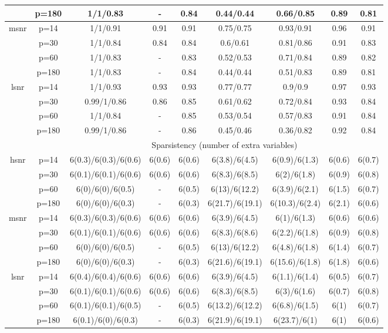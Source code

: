 \begin{table}[ht]
{\begin{tabular}{|c|c|ccccccc|}
   & p=180 & 1/1/0.83 & - & 0.84 & 0.44/0.44 & 0.66/0.85 & 0.89 & 0.81 \\ 
  \midrule\multirow{4}[2]{*}{msnr} & p=14 & 1/1/0.91 & 0.91 & 0.91 & 0.75/0.75 & 0.93/0.91 & 0.96 & 0.91 \\ 
   & p=30 & 1/1/0.84 & 0.84 & 0.84 & 0.6/0.61 & 0.81/0.86 & 0.91 & 0.83 \\ 
   & p=60 & 1/1/0.83 & - & 0.83 & 0.52/0.53 & 0.71/0.84 & 0.89 & 0.82 \\ 
   & p=180 & 1/1/0.83 & - & 0.84 & 0.44/0.44 & 0.51/0.83 & 0.89 & 0.81 \\ 
  \midrule\multirow{4}[2]{*}{lsnr} & p=14 & 1/1/0.93 & 0.93 & 0.93 & 0.77/0.77 & 0.9/0.9 & 0.97 & 0.93 \\ 
   & p=30 & 0.99/1/0.86 & 0.86 & 0.85 & 0.61/0.62 & 0.72/0.84 & 0.93 & 0.84 \\ 
   & p=60 & 1/1/0.84 & - & 0.85 & 0.53/0.54 & 0.57/0.83 & 0.91 & 0.84 \\ 
   & p=180 & 0.99/1/0.86 & - & 0.86 & 0.45/0.46 & 0.36/0.82 & 0.92 & 0.84 \\ 
   \midrule 
 \multicolumn{1}{|c}{} &       & \multicolumn{7}{c|}{Sparsistency (number of extra variables)} \\
\midrule\multirow{4}[2]{*}{hsnr} & p=14 & 6(0.3)/6(0.3)/6(0.6) & 6(0.6) & 6(0.6) & 6(3.8)/6(4.5) & 6(0.9)/6(1.3) & 6(0.6) & 6(0.7) \\ 
   & p=30 & 6(0.1)/6(0.1)/6(0.6) & 6(0.6) & 6(0.6) & 6(8.3)/6(8.5) & 6(2)/6(1.8) & 6(0.9) & 6(0.8) \\ 
   & p=60 & 6(0)/6(0)/6(0.5) & - & 6(0.5) & 6(13)/6(12.2) & 6(3.9)/6(2.1) & 6(1.5) & 6(0.7) \\ 
   & p=180 & 6(0)/6(0)/6(0.3) & - & 6(0.3) & 6(21.7)/6(19.1) & 6(10.3)/6(2.4) & 6(2.1) & 6(0.6) \\ 
  \midrule\multirow{4}[2]{*}{msnr} & p=14 & 6(0.3)/6(0.3)/6(0.6) & 6(0.6) & 6(0.6) & 6(3.9)/6(4.5) & 6(1)/6(1.3) & 6(0.6) & 6(0.6) \\ 
   & p=30 & 6(0.1)/6(0.1)/6(0.6) & 6(0.6) & 6(0.6) & 6(8.3)/6(8.6) & 6(2.2)/6(1.8) & 6(0.9) & 6(0.8) \\ 
   & p=60 & 6(0)/6(0)/6(0.5) & - & 6(0.5) & 6(13)/6(12.2) & 6(4.8)/6(1.8) & 6(1.4) & 6(0.7) \\ 
   & p=180 & 6(0)/6(0)/6(0.3) & - & 6(0.3) & 6(21.6)/6(19.1) & 6(15.6)/6(1.8) & 6(1.8) & 6(0.6) \\ 
  \midrule\multirow{4}[2]{*}{lsnr} & p=14 & 6(0.4)/6(0.4)/6(0.6) & 6(0.6) & 6(0.6) & 6(3.9)/6(4.5) & 6(1.1)/6(1.4) & 6(0.5) & 6(0.7) \\ 
   & p=30 & 6(0.1)/6(0.1)/6(0.6) & 6(0.6) & 6(0.6) & 6(8.3)/6(8.5) & 6(3)/6(1.6) & 6(0.7) & 6(0.8) \\ 
   & p=60 & 6(0.1)/6(0.1)/6(0.5) & - & 6(0.5) & 6(13.2)/6(12.2) & 6(6.8)/6(1.5) & 6(1) & 6(0.7) \\ 
   & p=180 & 6(0.1)/6(0)/6(0.3) & - & 6(0.3) & 6(21.9)/6(19.1) & 6(23.7)/6(1) & 6(1) & 6(0.6) \\ 
   \bottomrule 
\end{tabular}
}
\end{table}
